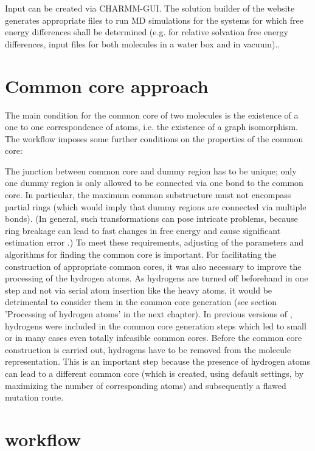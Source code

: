 Input can be created via CHARMM-GUI\cite{Jo.2008}. The solution builder of the website generates appropriate files to run MD simulations for the systems for which free energy differences shall be determined (e.g. for relative solvation free energy differences, input files for both molecules in a water box and in vacuum).\cite{Braunsfeld., Karwounopoulos.2022}.

\section{Common core approach}

The main condition for the common core of two molecules is the existence
of a one to one correspondence of atoms, i.e. the existence of a graph
isomorphism. The {\trafo} workflow imposes some further conditions
on the properties of the common core:

The junction between common core and dummy region has to be unique;
only one dummy region is only allowed to be connected via one bond to the
common core. In particular, the maximum common substructure must not
encompass partial rings (which would imply that dummy regions are
connected via multiple bonds). (In general, such transformations can pose intricate problems, because ring breakage can lead to fast changes in free energy
and cause significant estimation error \cite{Liu.2015}.)
To meet these requirements, adjusting of the parameters and algorithms for finding the common core is important. For facilitating the construction of appropriate common cores, it was also necessary to improve the processing of the hydrogen atoms. As hydrogens are turned off beforehand in one step and not via serial atom insertion like the heavy atoms, it would be  detrimental to consider them in the common core generation (see section 'Processing of hydrogen atoms' in the next chapter). In previous versions of {\trafo}, hydrogens were included in the common core generation steps which led to small or in many cases even totally infeasible common cores. Before the common core construction is carried out, hydrogens have to be
removed from the molecule representation. This is an important step
because the presence of hydrogen atoms can lead to a different common
core (which is created, using default settings, by maximizing the
number of corresponding atoms) and subsequently a flawed mutation
route. 




\section{{\trafo} workflow}



